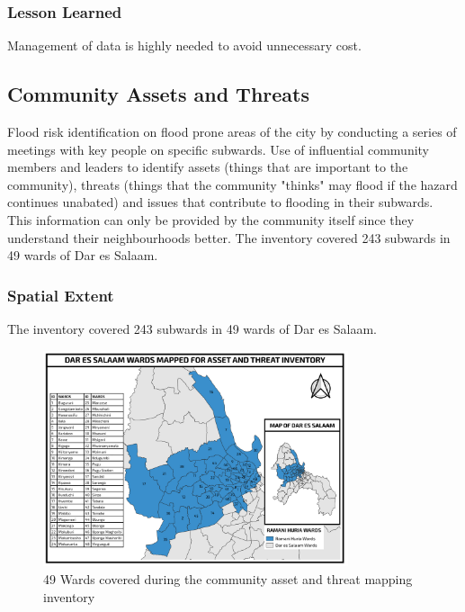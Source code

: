 \documentclass[a4paper,12pt,twoside]{article}
\begin{document}
\subsubsection{Lesson Learned}
Management of data is highly needed to avoid unnecessary cost.

\newpage

\subsection{Community Assets and Threats}

\begin{multicols}{2}
Flood risk identification on flood prone areas of the city by conducting a series of meetings with key people on specific subwards. Use of influential community members and leaders to identify assets (things that are important to the community), threats (things that the community "thinks" may flood if the hazard continues unabated) and issues that contribute to flooding in their subwards. This information can only be provided by the community itself since they understand their neighbourhoods better. The inventory covered  243 subwards in 49 wards of Dar es Salaam. 
\end{multicols}

\subsubsection{Spatial Extent}
The inventory covered  243 subwards in 49 wards of Dar es Salaam. 

\begin{figure}[h]
  \color{RHgreen}\caption{49 Wards covered during the community asset and threat mapping inventory}
  \centering
  \includegraphics[width=0.8\textwidth]{images/asset_and_threat_wards.png}
\end{figure}
\end{document}
